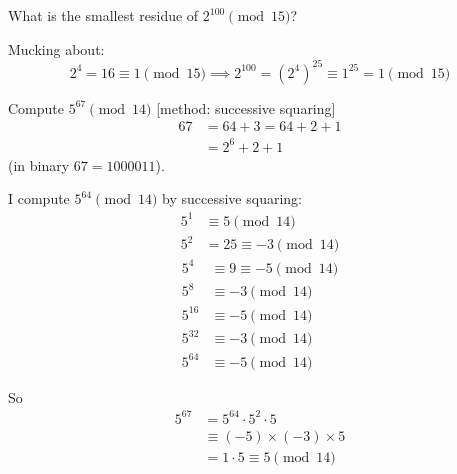 \documentclass[10pt]{scrartcl}
\begin{document}
\begin{example}
What is the smallest residue of $2^{100} \pmod{15}$? 	

Mucking about: \[2^4 = 16 \equiv 1 \pmod{15}\implies 2^{100} = (2^4)^{25} \equiv 1^{25} = 1\pmod{15}\]
\end{example}\vspace*{5pt}


\begin{example}
Compute $5^{67} \pmod{14}$ [method: successive squaring]
\[
\begin{aligned}
  67 &= 64 + 3 = 64 + 2 + 1 \\
  &= 2^6 + 2 + 1
\end{aligned}
\]
(in binary $67 = 1000011$). 

I compute $5^{64} \pmod{14}$ by successive squaring: 
\begin{align*}
  5^1 &\equiv 5 \pmod{14}\\
  5^2 &= 25 \equiv -3 \pmod{14}
 \end{align*}
\begin{align*}
  5^4 &\equiv 9 \equiv -5 \pmod{14}\\
  5^8 &\equiv -3 \pmod{14}\\
  5^{16} &\equiv -5 \pmod{14}\\
  5^{32} &\equiv -3 \pmod{14}\\
  5^{64} &\equiv -5 \pmod{14} 
\end{align*}

So
\[
\begin{aligned}
  5^{67} &= 5^{64} \cdot 5^2 \cdot 5\\
  &\equiv (-5) \times (-3) \times 5\\
  &= 1\cdot 5 \equiv 5 \pmod{14}
\end{aligned}
\]
\end{example}\vspace*{5pt}
\end{document}

